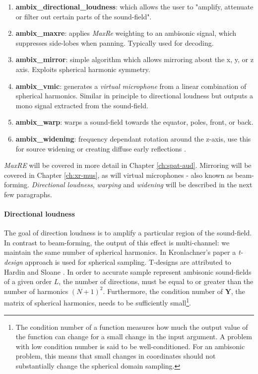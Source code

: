\begin{enumerate}
    \item \textbf{ambix\_directional\_loudness}: which allows the user to "amplify, attenuate or filter out certain parts of the sound-field". 
    \item \textbf{ambix\_maxre}: applies \textit{MaxRe} weighting to an ambisonic signal, which suppresses side-lobes when panning. Typically used for decoding.
    \item \textbf{ambix\_mirror}: simple algorithm which allows mirroring about the x, y, or z axis. Exploits spherical harmonic symmetry.
    \item \textbf{ambix\_vmic}: generates a \textit{virtual microphone} from a linear combination of spherical harmonics. Similar in principle to directional loudness but outputs a mono signal extracted from the sound-field. 
    \item \textbf{ambix\_warp}: warps a sound-field towards the equator, poles, front, or back. 
    \item \textbf{ambix\_widening}: frequency dependant rotation around the z-axis, use this for source widening or creating diffuse early reflections \cite{zotter2014efficient}.
\end{enumerate}

\textit{MaxRE} will be covered in more detail in Chapter \ref{ch:spat-aud}. Mirroring will be covered in Chapter \ref{ch:xr-mus}, as will virtual microphones - also known as beam-forming. \textit{Directional loudness}, \textit{warping} and \textit{widening} will be described in the next few paragraphs. 

\paragraph{Directional loudness}

The goal of direction loudness is to amplify a particular region of the sound-field. In contrast to beam-forming, the output of this effect is multi-channel: we maintain the same number of spherical harmonics. In Kronlachner's paper \cite{kronlachner2014spatial} a \textit{t-design} approach is used for spherical sampling. T-designs are attributed to Hardin and Sloane \cite{hardin1996mclaren}. In order to accurate sample represent ambisonic sound-fields of a given order $L$, the number of directions, must be equal to or greater than the number of harmonics $(N +1)^2$. Furthermore, the condition number of $\mathbf{Y}$, the matrix of spherical harmonics, needs to be sufficiently small\footnote{The condition number of a function measures how much the output value of the function can change for a small change in the input argument. A problem with low condition number is said to be well-conditioned. For an ambisonic problem, this means that small changes in coordinates should not substantially change the spherical domain sampling.}. 

